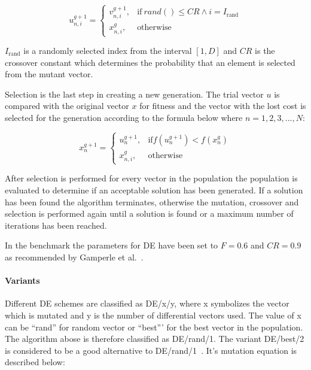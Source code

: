 \begin{equation}
    u_{n,i}^{g+1} =
    \begin{cases}
      v_{n,i}^{g+1}, & \text{if}\ rand() \leq CR \wedge i = I_{\text{rand}} \\
      x_{n,i}^{g}, & \text{otherwise}
\end{cases}
\end{equation}

$I_{\text{rand}}$ is a randomly selected index from the interval $[1,D]$ and $CR$ is the crossover constant which determines the probability that an element is selected from the mutant vector.

Selection is the last step in creating a new generation. The trial vector $u$ is compared with the original vector $x$ for fitness and the vector with the lost cost is selected for the generation according to the formula below where $n=1,2,3,...,N$:

\begin{equation}
    x_{n}^{g+1} =
    \begin{cases}
      u_{n}^{g+1}, & \text{if} f(u_{n}^{g+1}) < f(x_{n}^{g}) \\
      x_{n,i}^{g}, & \text{otherwise}
\end{cases}
\end{equation}

After selection is performed for every vector in the population the population is evaluated to determine if an acceptable solution has been generated. If a solution has been found the algorithm terminates, otherwise the mutation, crossover and selection is performed again until a solution is found or a maximum number of iterations has been reached.

In the benchmark the parameters for DE have been set to $F = 0.6$ and $CR=0.9$ as recommended by Gamperle et al.~\cite{gamperle2002parameter}.

\paragraph{Variants}

Different DE schemes are classified as DE/x/y, where x symbolizes the vector which is mutated and y is the number of differential vectors used. The value of x can be ``rand'' for random vector or ``best''' for the best vector in the population. The algorithm abose is therefore classified as DE/rand/1. The variant DE/best/2 is considered to be a good alternative to DE/rand/1~\cite{qin2009differential}. It's mutation equation is described below:

